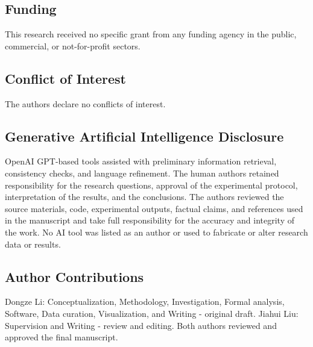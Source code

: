 \documentclass[
  10pt,
]{article}
\begin{document}
\subsection{Funding}\label{funding}

This research received no specific grant from any funding agency in the
public, commercial, or not-for-profit sectors.

\subsection{Conflict of Interest}\label{conflict-of-interest}

The authors declare no conflicts of interest.

\subsection{Generative Artificial Intelligence
Disclosure}\label{generative-artificial-intelligence-disclosure}

OpenAI GPT-based tools assisted with preliminary information retrieval,
consistency checks, and language refinement. The human authors retained
responsibility for the research questions, approval of the experimental
protocol, interpretation of the results, and the conclusions. The
authors reviewed the source materials, code, experimental outputs,
factual claims, and references used in the manuscript and take full
responsibility for the accuracy and integrity of the work. No AI tool
was listed as an author or used to fabricate or alter research data or
results.

\subsection{Author Contributions}\label{author-contributions}

Dongze Li: Conceptualization, Methodology, Investigation, Formal
analysis, Software, Data curation, Visualization, and Writing - original
draft. Jiahui Liu: Supervision and Writing - review and editing. Both
authors reviewed and approved the final manuscript.


\end{document}
